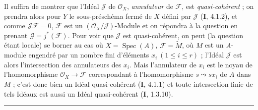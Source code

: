 Il suffira de montrer que l'Idéal $\mathscr J$ de $\mathscr O_X$,
\emph{annulateur} de $\mathscr F$, est \emph{quasi-cohérent} ; on prendra alors
pour $Y$ le sous-préschéma fermé de $X$ défini par $\mathscr J$ (\textbf{I}, 4.1.2), et
comme $\mathscr J\mathscr F=0$, $\mathscr F$ est un
$(\mathscr O_X/\mathscr J)$-Module et on répondra à la question en prenant
$\mathscr G=j^*(\mathscr F)$. Pour voir que $\mathscr J$ est quasi-cohérent, on
peut (la question étant locale) se borner au cas où
$X=\operatorname{Spec}(A)$, $\mathscr F=\widetilde M$, où $M$ est un $A$-module
engendré par un nombre fini d'éléments $x_i\ (1\leq i\leq r)$ ; l'Idéal
$\mathscr J$ est alors l'intersection des annulateurs des $x_i$. Mais
l'annulateur de $x_i$ est le noyau de l'homomorphisme
$\mathscr O_X\to\mathscr F$ correspondant à l'homomorphisme $s\leadsto sx_i$ de
$A$ dans $M$ ; c'est donc bien un Idéal quasi-cohérent (\textbf{I}, 4.1.1) et toute
intersection finie de tels Idéaux est aussi un Idéal quasi-cohérent (\textbf{I},
1.3.10).

\begin{center}\rule{25mm}{0.4pt}\end{center}
